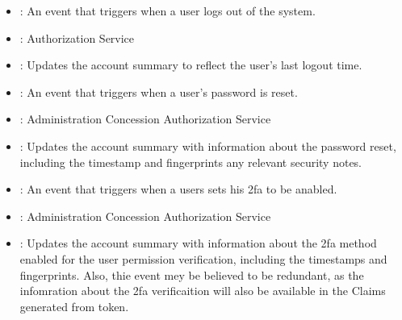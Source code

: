 \documentclass[letterpaper,10pt,english]{sphinxmanual}
\begin{document}
\sphinxAtStartPar
{}
\begin{itemize}
\item {} 
\sphinxAtStartPar
{}: An event that triggers when a user logs out of the system.

\item {} 
\sphinxAtStartPar
{}: Authorization Service

\item {} 
\sphinxAtStartPar
{}: Updates the account summary to reflect the user’s last logout time.

\end{itemize}

\sphinxAtStartPar
{}
\begin{itemize}
\item {} 
\sphinxAtStartPar
{}: An event that triggers when a user’s password is reset.

\item {} 
\sphinxAtStartPar
{}: Administration Concession Authorization Service

\item {} 
\sphinxAtStartPar
{}: Updates the account summary with information about the password reset, including the timestamp and fingerprints any relevant security notes.

\end{itemize}

\sphinxAtStartPar
{}
\begin{itemize}
\item {} 
\sphinxAtStartPar
{}: An event that triggers when a users sets his 2fa to be anabled.

\item {} 
\sphinxAtStartPar
{}: Administration Concession Authorization Service

\item {} 
\sphinxAtStartPar
{}: Updates the account summary with information about the 2fa method enabled for the user permission verification, including the timestamps and fingerprints. Also, thie event mey be believed to be redundant, as the infomration about the 2fa verificaition will also be available in the Claims generated from token.

\end{itemize}
\end{document}

